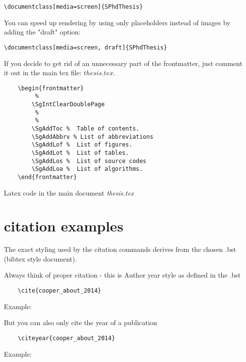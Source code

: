 \begin{verbatim}
\documentclass[media=screen]{SPhdThesis}
\end{verbatim}

You can speed up rendering by using only placeholders instead of images by adding the "draft" option:

\begin{verbatim}
\documentclass[media=screen, draft]{SPhdThesis}
\end{verbatim}



If you decide to get rid of an unnecessary part of the frontmatter, just comment it out in the main \.tex file: \(thesis.tex\). 

\begin{listing}
\begin{verbatim}
	\begin{frontmatter}
		 %
		\SgIntClearDoublePage
		 %
		 %
		\SgAddToc %  Table of contents.
		\SgAddAbbrv % List of abbreviations
		\SgAddLof %  List of figures.
		\SgAddLot %  List of tables.
		\SgAddLos %  List of source codes
		\SgAddLoa %  List of algorithms.
	\end{frontmatter}
\end{verbatim}
\caption{Latex code in the main document \textit{thesis.tex}}
\label{lst:latexexample}
\end{listing}

\section{citation examples}
\label{sec:citeationexamples}

The exact styling used by the citation commands derives from the chosen .bst (bibtex style document).

Always think of proper citation - this is Author year style as defined in the .bst

\begin{verbatim}
	\cite{cooper_about_2014}
\end{verbatim}
Example:	
	\cite{cooper_about_2014}

But you can also only cite the year of a publication 

\begin{verbatim}
	\citeyear{cooper_about_2014}
\end{verbatim} 

Example:
	\citeyear{cooper_about_2014}

